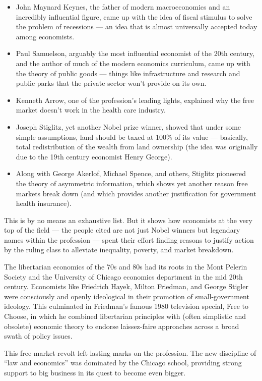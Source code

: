 \documentclass[
]{book}
\begin{document}
\begin{itemize}
\item
  John Maynard Keynes, the father of modern macroeconomics and an incredibly influential figure, came up with the idea of fiscal stimulus to solve the problem of recessions --- an idea that is almost universally accepted today among economists.
\item
  Paul Samuelson, arguably the most influential economist of the 20th century, and the author of much of the modern economics curriculum, came up with the theory of public goods --- things like infrastructure and research and public parks that the private sector won't provide on its own.
\item
  Kenneth Arrow, one of the profession's leading lights, explained why the free market doesn't work in the health care industry.
\item
  Joseph Stiglitz, yet another Nobel prize winner, showed that under some simple assumptions, land should be taxed at 100\% of its value --- basically, total redistribution of the wealth from land ownership (the idea was originally due to the 19th century economist Henry George).
\item
  Along with George Akerlof, Michael Spence, and others, Stiglitz pioneered the theory of asymmetric information, which shows yet another reason free markets break down (and which provides another justification for government health insurance).
\end{itemize}

This is by no means an exhaustive list. But it shows how economists at the very top of the field --- the people cited are not just Nobel winners but legendary names within the profession --- spent their effort finding reasons to justify action by the ruling class to alleviate inequality, poverty, and market breakdown.

The libertarian economics of the 70s and 80s had its roots in the Mont Pelerin Society and the University of Chicago economics department in the mid 20th century. Economists like Friedrich Hayek, Milton Friedman, and George Stigler were consciously and openly ideological in their promotion of small-government ideology. This culminated in Friedman's famous 1980 television special, Free to Choose, in which he combined libertarian principles with (often simplistic and obsolete) economic theory to endorse laissez-faire approaches across a broad swath of policy issues.

This free-market revolt left lasting marks on the profession. The new discipline of ``law and economics'' was dominated by the Chicago school, providing strong support to big business in its quest to become even bigger.
\end{document}
